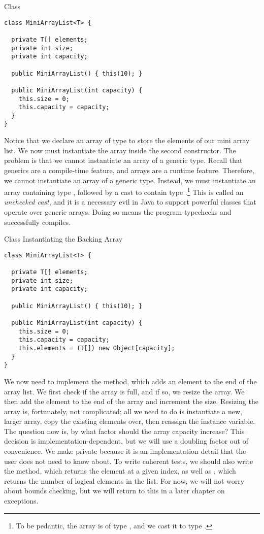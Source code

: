 \begin{cl}{ Class}
\begin{lstlisting}[language=MyJava]
class MiniArrayList<T> {

  private T[] elements;
  private int size;
  private int capacity;

  public MiniArrayList() { this(10); }

  public MiniArrayList(int capacity) {
    this.size = 0;
    this.capacity = capacity;
  }
}
\end{lstlisting}
\end{cl}

Notice that we declare an array of type  to store the elements of our mini array list. We now must instantiate the array inside the second constructor. The problem is that we cannot instantiate an array of a generic type. Recall that generics are a compile-time feature, and arrays are a runtime feature. Therefore, we cannot instantiate an array of a generic type. Instead, we must instantiate an array containing type , followed by a cast to contain type .\footnote{To be pedantic, the array is of type , and we cast it to type .} This is called an \textit{unchecked cast}, and it is a necessary evil in Java to support powerful classes that operate over generic arrays. Doing so means the program typechecks and successfully compiles.

\begin{cl}{ Class Instantiating the Backing Array}
\begin{lstlisting}[language=MyJava]
class MiniArrayList<T> {

  private T[] elements;
  private int size;
  private int capacity;

  public MiniArrayList() { this(10); }

  public MiniArrayList(int capacity) {
    this.size = 0;
    this.capacity = capacity;
    this.elements = (T[]) new Object[capacity];
  }
}
\end{lstlisting}
\end{cl}

We now need to implement the  method, which adds an element to the end of the array list. We first check if the array is full, and if so, we resize the array. We then add the element to the end of the array and increment the size. Resizing the array is, fortunately, not complicated; all we need to do is instantiate a new, larger array, copy the existing elements over, then reassign the instance variable. The question now is, by what factor should the array capacity increase? This decision is implementation-dependent, but we will use a doubling factor out of convenience. We make  private because it is an implementation detail that the user does not need to know about. To write coherent tests, we should also write the  method, which returns the element at a given index, as well as , which returns the number of logical elements in the list. For now, we will not worry about bounds checking, but we will return to this in a later chapter on exceptions.

